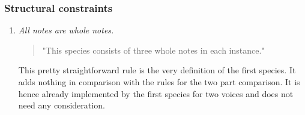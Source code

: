 \subsubsection{Structural constraints}
\begin{enumerate}[wide, label=\bfseries 1.S\arabic*]
    \item\label{rule:allwhole} \textit{All notes are whole notes.}
     
    \begin{quotation}
       "This species consists of three whole notes in each instance."
       \textcite[p.71]{GaPEng}
   \end{quotation}

   This pretty straightforward rule is the very definition of the first species. It adds nothing in comparison with the rules for the two part comparison. It is hence already implemented by the first species for two voices and does not need any consideration. 
\end{enumerate}
